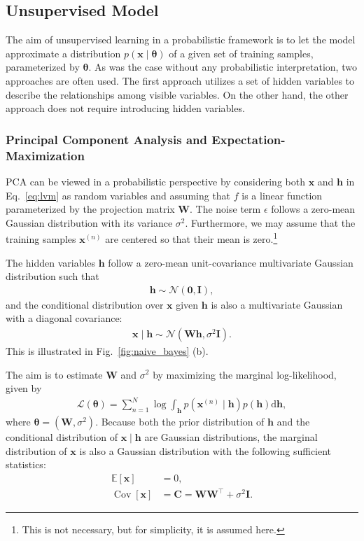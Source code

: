 \documentclass{now}
\newcommand{\vect}[1]{\mathbf{#1}}
\newcommand{\vects}[1]{\boldsymbol{#1}}
\newcommand{\matr}[1]{\mathbf{#1}}
\newcommand{\cov}[0]{\operatorname{Cov}}
\newcommand{\vh}[0]{\vect{h}}
\newcommand{\vx}[0]{\vect{x}}
\newcommand{\mW}[0]{\matr{W}}
\newcommand{\mC}{\matr{C}}
\newcommand{\mI}{\matr{I}}
\newcommand{\vzero}[0]{\vects{0}}
\newcommand{\TT}[0]{{\vects{\theta}}}
\newcommand{\NN}[0]{\mathcal{N}}
\newcommand{\LL}[0]{\mathcal{L}}
\newcommand{\E}[0]{\mathbb{E}}
\newcommand{\dd}[1]{\text{d}{#1}}
\begin{document}
\subsection{Unsupervised Model}

The aim of unsupervised learning in a probabilistic
framework is to let the model approximate a distribution
$p(\vx \mid \TT)$ of a given set of training samples,
parameterized by $\TT$. As was the case without any
probabilistic interpretation, two approaches are often used.
The first approach utilizes a set of hidden variables to
describe the relationships among visible variables. On the
other hand, the other approach does not require
introducing hidden variables.

\subsubsection{Principal Component Analysis and
Expectation-Maximization}
\label{sec:ppca}

PCA can be viewed in a probabilistic perspective
\citep[see, e.g.,][]{Tipping1999,Roweis1998} by considering
both $\vx$ and $\vh$ in Eq.~\eqref{eq:lvm} as random
variables and assuming that $f$ is a linear function
parameterized by the projection matrix $\mW$. The noise term
$\epsilon$ follows a zero-mean Gaussian distribution with
its variance $\sigma^2$. Furthermore, we may assume that the
training samples $\vx^{(n)}$ are centered so that their
mean is zero.\footnote{This is not necessary, but for
simplicity, it is assumed here.}

The hidden variables $\vh$ follow a zero-mean
unit-covariance multivariate Gaussian distribution such that
\begin{align*}
    \vh \sim \NN(\vzero, \mI),
\end{align*}
and the conditional distribution over $\vx$ given $\vh$ is
also a multivariate Gaussian with a diagonal covariance:
\begin{align*}
    \vx \mid \vh \sim \NN(\mW \vh, \sigma^2 \mI).
\end{align*}
This is illustrated in Fig.~\ref{fig:naive_bayes} (b).

The aim is to estimate $\mW$ and $\sigma^2$ by maximizing
the marginal log-likelihood, given by
\begin{align}
    \label{eq:ppca_mll}
    \LL(\TT) = \sum_{n=1}^N \log \int_{\vh} p(\vx^{(n)} \mid \vh)
    p(\vh) \dd{\vh},
\end{align}
where $\TT=\left( \mW, \sigma^2 \right)$. Because both the prior
distribution of $\vh$ and the conditional distribution of
$\vx \mid \vh$ are Gaussian distributions, 
the marginal distribution of $\vx$ is also a Gaussian
distribution with the following sufficient statistics:
\begin{align*}
    \E\left[ \vx \right] &= 0,\\
    \cov\left[ \vx \right] &= \mC = \mW \mW^\top + \sigma^2 \mI.
\end{align*}
\end{document}
